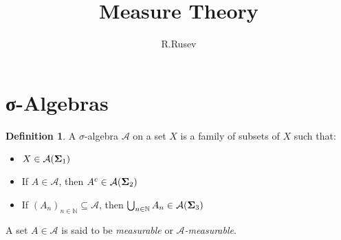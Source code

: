 \documentclass[12pt]{article}
\title{\textbf{Measure Theory}\\[0.5em]}
\author{R.Rusev}
\date{}
\theoremstyle{definition}
\newtheorem{definition}{Definition}[section]
\begin{document}
\maketitle

\section{σ-Algebras}

\medskip
\begin{definition}
A $\sigma$-algebra $\mathcal{A}$ on a set $X$ is a family of subsets of $X$ such that:
\begin{itemize}
    \item $X \in \mathcal{A} \hfill \text{($\boldsymbol{\Sigma}_1$)}$
    \item If $A \in \mathcal{A}$, then $A^c \in \mathcal{A} \hfill \text{($\boldsymbol{\Sigma}_2$)}$
    \item If $(A_n)_{n \in \mathbb{N}} \subseteq \mathcal{A}$, then $\bigcup_{n \in \mathbb{N}} A_n \in \mathcal{A} \hfill \text{($\boldsymbol{\Sigma}_3$)}$
\end{itemize}

\medskip

A set $A \in \mathcal{A}$ is said to be \textit{measurable} or \textit{$\mathcal{A}$-measurable}.
\end{definition}
\end{document}
